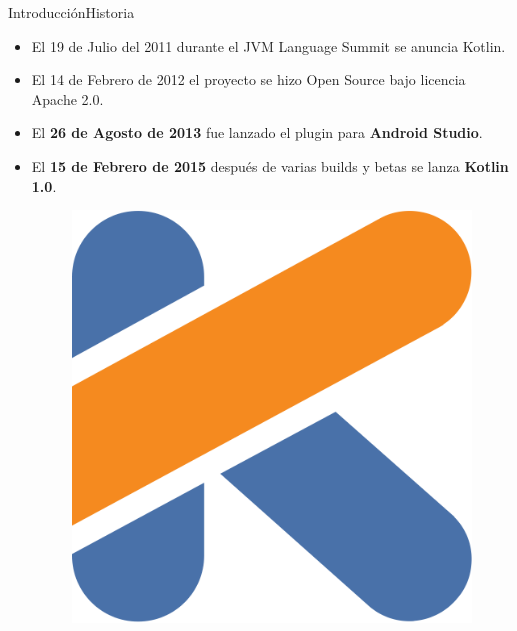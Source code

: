 \begin{frame}{Introducción}{Historia}
 \begin{itemize}
  \item El 19 de Julio del 2011 durante el JVM Language Summit se anuncia Kotlin.
  \item El 14 de Febrero de 2012 el proyecto se hizo Open Source bajo licencia Apache 2.0.
        \item<1-> El \textbf{26 de Agosto de 2013} fue lanzado el plugin para \textbf{Android Studio}.
        \item<2-> El \textbf{15 de Febrero de 2015} después de varias builds y betas se lanza \textbf{Kotlin 1.0}.
        \begin{figure}[!htb]
         \endminipage
         \includegraphics[width=\linewidth]{images/introduction/kotlin_logo_1}
         \endminipage
         \endminipage
        \end{figure}
 \end{itemize}
\end{frame}
